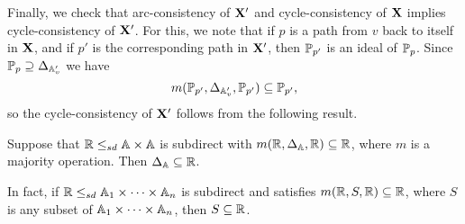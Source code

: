 \documentclass[letterpaper,11pt]{article}
\begin{document}
Finally, we check that arc-consistency of $\mathbf{X}'$ and cycle-consistency of $\mathbf{X}$ implies cycle-consistency of $\mathbf{X}'$. For this, we note that if $p$ is a path from $v$ back to itself in $\mathbf{X}$, and if $p'$ is the corresponding path in $\mathbf{X}'$, then $\mathbb{P}_{p'}$ is an ideal of $\mathbb{P}_p$. Since $\mathbb{P}_p \supseteq \Delta_{\mathbb{A}_v'}$ we have
\[
m(\mathbb{P}_{p'}, \Delta_{\mathbb{A}_v'}, \mathbb{P}_{p'}) \subseteq \mathbb{P}_{p'},
\]
so the cycle-consistency of $\mathbf{X}'$ follows from the following result.

\begin{thm}\label{ideal-diagonal} Suppose that $\mathbb{R} \le_{sd} \mathbb{A}\times \mathbb{A}$ is subdirect with $m(\mathbb{R},\Delta_{\mathbb{A}},\mathbb{R}) \subseteq \mathbb{R}$, where $m$ is a majority operation. Then $\Delta_{\mathbb{A}} \subseteq \mathbb{R}$.

In fact, if $\mathbb{R} \le_{sd} \mathbb{A}_1 \times \cdots \times \mathbb{A}_n$ is subdirect and satisfies $m(\mathbb{R},S,\mathbb{R}) \subseteq \mathbb{R}$, where $S$ is any subset of $\mathbb{A}_1 \times \cdots \times \mathbb{A}_n$, then $S \subseteq \mathbb{R}$.
\end{thm}
\end{document}
